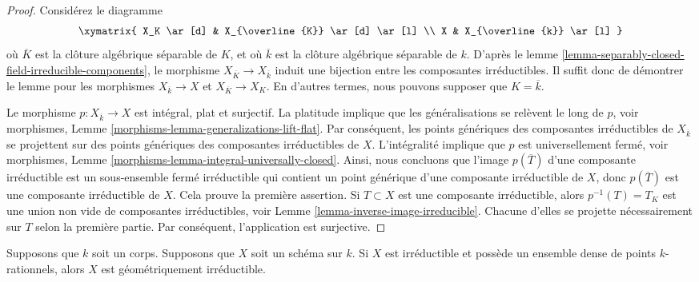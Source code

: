 \begin{proof}
Considérez le diagramme
$$
\xymatrix{
X_K \ar[d] & X_{\overline{K}} \ar[d] \ar[l] \\
X & X_{\overline{k}} \ar[l]
}
$$
où $\overline{K}$ est la clôture algébrique séparable de $K$,
et où $\overline{k}$ est la clôture algébrique séparable de
$k$. D'après le lemme
\ref{lemma-separably-closed-field-irreducible-components}, le
morphisme $X_{\overline{K}} \to X_{\overline{k}}$ induit une bijection
entre les composantes irréductibles. Il suffit donc de démontrer le
lemme pour les morphismes $X_{\overline{k}} \to X$ et $X_{\overline{K}}
\to X_K$. En d'autres termes, nous pouvons supposer que $K = \overline{k}$.

\medskip\noindent
Le morphisme $p : X_{\overline{k}} \to X$ est intégral, plat et
surjectif. La platitude implique que les généralisations se relèvent
le long de $p$, voir morphismes, Lemme
\ref{morphisms-lemma-generalizations-lift-flat}. Par conséquent, les
points génériques des composantes irréductibles de $X_{\overline{k}}$ se
projettent sur des points génériques des composantes irréductibles de
$X$. L'intégralité implique que $p$ est universellement fermé, voir
morphismes, Lemme \ref{morphisms-lemma-integral-universally-closed}.
Ainsi, nous concluons que l'image $p(\overline{T})$ d'une composante
irréductible est un sous-ensemble fermé irréductible qui contient un point
générique d'une composante irréductible de $X$, donc $p(\overline{T})$ est
une composante irréductible de $X$. Cela prouve la première assertion. Si
$T \subset X$ est une composante irréductible, alors $p^{-1}(T) =T_K$ est
une union non vide de composantes irréductibles, voir Lemme
\ref{lemma-inverse-image-irreducible}. Chacune d'elles se projette nécessairement
sur $T$ selon la première partie. Par conséquent, l'application est surjective.
\end{proof}

\begin{lemma}
\label{lemma-irreducible-dense-rational-points-geometrically-irreducible}
Supposons que $k$ soit un corps. Supposons que $X$ soit un schéma
sur $k$. Si $X$ est irréductible et possède un ensemble dense de
points $k$-rationnels, alors $X$ est géométriquement irréductible.
\end{lemma}

